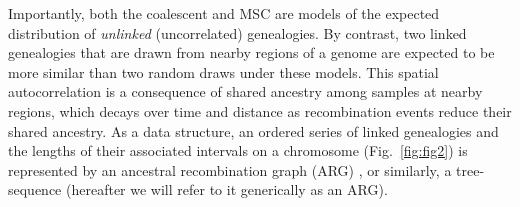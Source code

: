 \documentclass[11pt]{article}
\begin{document}
Importantly, both the coalescent and MSC are models of the expected distribution of 
\emph{unlinked} (uncorrelated) genealogies.
By contrast, two linked genealogies that are drawn from nearby regions of a genome %
are expected to be more similar than two random draws under these models. This spatial 
autocorrelation is a consequence of shared ancestry among samples at nearby regions, 
which decays over time and distance as recombination events reduce their shared ancestry.
As a data structure, an ordered series of linked genealogies and the lengths of 
their associated intervals on a chromosome (Fig.~\ref{fig:fig2}) is represented 
by an ancestral recombination graph (ARG)
\citep{griffiths_ancestral_1996}, or similarly, a tree-sequence 
\citep{kelleher2016efficient}
(hereafter we will refer to it generically as an ARG).

\end{document}
